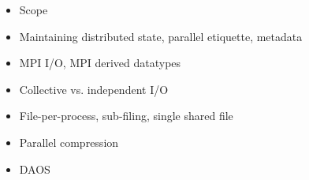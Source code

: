 



\begin{itemize}
    \item Scope
    \item Maintaining distributed state, parallel etiquette, metadata
    \item MPI I/O, MPI derived datatypes~\cite{thakur1998}
    \item Collective vs. independent I/O
    \item File-per-process, sub-filing, single shared file
    \item Parallel compression
    \item DAOS~\cite{soumagne2021}
\end{itemize}